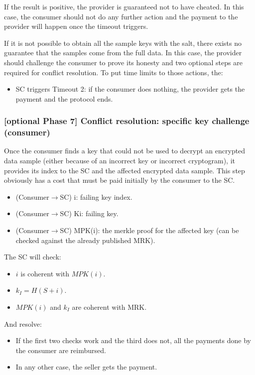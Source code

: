 \documentclass[]{article}
\begin{document}
	If the result is positive, the provider is guaranteed not to have cheated. In this case, the consumer should not do any further action and the payment to the provider will happen once the timeout triggers. 

	If it is not possible to obtain all the sample keys with the salt, there exists no guarantee that the samples come from the full data. In this case, the provider should challenge the consumer to prove its honesty and two optional steps are required for conflict resolution. To put time limits to those actions, the:
	\begin{itemize}
		\item SC triggers Timeout 2: if the consumer does nothing, the provider gets the payment and the protocol ends.
	\end{itemize}
	
	\subsubsection{[optional Phase 7] Conflict resolution: specific key challenge (consumer)}
	Once the consumer finds a key that could not be used to decrypt an encrypted data sample (either because of an incorrect key or incorrect cryptogram), it provides its index to the SC and the affected encrypted data sample. This step obviously has a cost that must be paid initially by the consumer to the SC.

	\begin{itemize}
		\item (Consumer$\rightarrow$SC) i: failing key index.
		\item (Consumer$\rightarrow$SC) Ki: failing key.
		\item (Consumer$\rightarrow$SC) MPK(i): the merkle proof for the affected key (can be checked against the already published MRK).
	\end{itemize}

	The SC will check: 
	\begin{itemize}
		\item $i$ is coherent with $MPK(i)$.
		\item $k_I=H(S+i)$.
		\item $MPK(i)$ and $k_I$ are coherent with MRK.
	\end{itemize}

	And resolve:
	\begin{itemize}
		\item If the first two checks work and the third does not, all the payments done by the consumer are reimbursed.
		\item In any other case, the seller gets the payment.
	\end{itemize}
		
\end{document}
